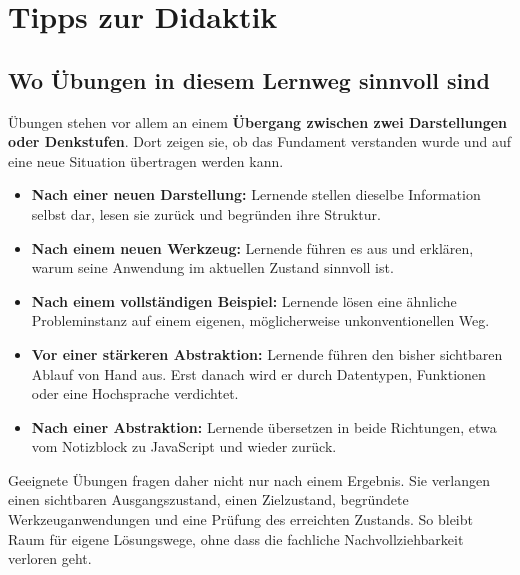 \documentclass{article}
\begin{document}
    
      
        \section{Tipps zur Didaktik}

        \subsection{Wo Übungen in diesem Lernweg sinnvoll sind}

        Übungen stehen vor allem an einem \textbf{Übergang zwischen zwei Darstellungen oder Denkstufen}. Dort zeigen sie, ob das Fundament verstanden wurde und auf eine neue Situation übertragen werden kann.

        \begin{itemize}
          \item \textbf{Nach einer neuen Darstellung:} Lernende stellen dieselbe Information selbst dar, lesen sie zurück und begründen ihre Struktur.
          \item \textbf{Nach einem neuen Werkzeug:} Lernende führen es aus und erklären, warum seine Anwendung im aktuellen Zustand sinnvoll ist.
          \item \textbf{Nach einem vollständigen Beispiel:} Lernende lösen eine ähnliche Probleminstanz auf einem eigenen, möglicherweise unkonventionellen Weg.
          \item \textbf{Vor einer stärkeren Abstraktion:} Lernende führen den bisher sichtbaren Ablauf von Hand aus. Erst danach wird er durch Datentypen, Funktionen oder eine Hochsprache verdichtet.
          \item \textbf{Nach einer Abstraktion:} Lernende übersetzen in beide Richtungen, etwa vom Notizblock zu JavaScript und wieder zurück.
        \end{itemize}

        Geeignete Übungen fragen daher nicht nur nach einem Ergebnis. Sie verlangen einen sichtbaren Ausgangszustand, einen Zielzustand, begründete Werkzeuganwendungen und eine Prüfung des erreichten Zustands. So bleibt Raum für eigene Lösungswege, ohne dass die fachliche Nachvollziehbarkeit verloren geht.
      
\end{document}
